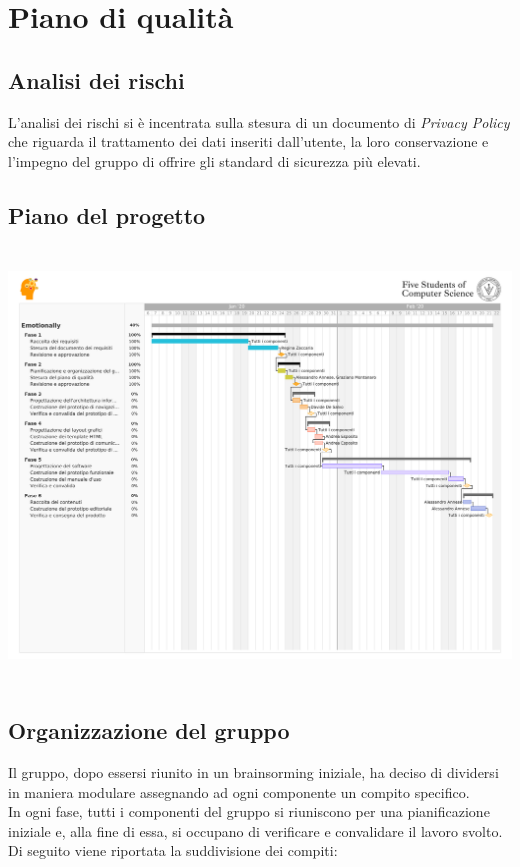 
\chapter{Piano di qualità}\label{chap:piano-qualita}

\section{Analisi dei rischi}\label{sec:analisi-rischi}
L'analisi dei rischi si è incentrata sulla stesura di un documento di 
\textit{Privacy Policy} che riguarda il trattamento dei dati inseriti 
dall'utente, la loro conservazione e l'impegno del gruppo di offrire gli 
standard di sicurezza più elevati. 

\section{Piano del progetto}\label{sec:piano-progetto}
\includegraphics[height=11.5cm, frame]{images/gantt.png}

\section{Organizzazione del gruppo}\label{sec:organizzazione-gruppo}
Il gruppo, dopo essersi riunito in un brainsorming iniziale, ha deciso di 
dividersi in maniera modulare assegnando ad ogni componente un compito 
specifico.\\
In ogni fase, tutti i componenti del gruppo si riuniscono per una 
pianificazione iniziale e, alla fine di essa, si occupano  di verificare e 
convalidare il lavoro svolto.\\
Di seguito viene riportata la suddivisione dei compiti:

